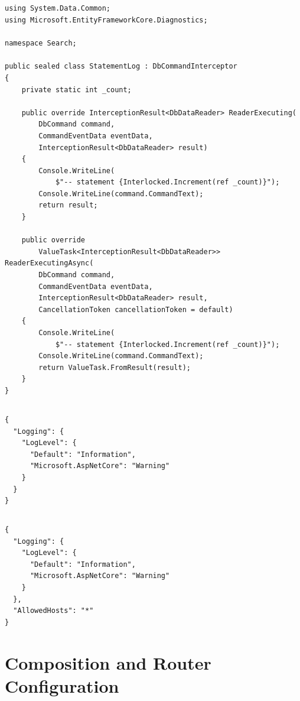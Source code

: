 \subsection*{}
\begin{verbatim}
using System.Data.Common;
using Microsoft.EntityFrameworkCore.Diagnostics;

namespace Search;

public sealed class StatementLog : DbCommandInterceptor
{
    private static int _count;

    public override InterceptionResult<DbDataReader> ReaderExecuting(
        DbCommand command,
        CommandEventData eventData,
        InterceptionResult<DbDataReader> result)
    {
        Console.WriteLine(
            $"-- statement {Interlocked.Increment(ref _count)}");
        Console.WriteLine(command.CommandText);
        return result;
    }

    public override
        ValueTask<InterceptionResult<DbDataReader>> ReaderExecutingAsync(
        DbCommand command,
        CommandEventData eventData,
        InterceptionResult<DbDataReader> result,
        CancellationToken cancellationToken = default)
    {
        Console.WriteLine(
            $"-- statement {Interlocked.Increment(ref _count)}");
        Console.WriteLine(command.CommandText);
        return ValueTask.FromResult(result);
    }
}
\end{verbatim}

\subsection*{}
\begin{verbatim}
{
  "Logging": {
    "LogLevel": {
      "Default": "Information",
      "Microsoft.AspNetCore": "Warning"
    }
  }
}
\end{verbatim}

\subsection*{}
\begin{verbatim}
{
  "Logging": {
    "LogLevel": {
      "Default": "Information",
      "Microsoft.AspNetCore": "Warning"
    }
  },
  "AllowedHosts": "*"
}
\end{verbatim}
\section{Composition and Router Configuration}

